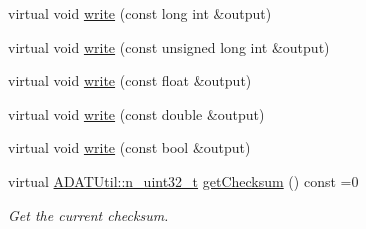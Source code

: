 \begin{DoxyCompactItemize}
\item 
virtual void \mbox{\hyperlink{classADATIO_1_1BinaryWriter_a4cbdd50c040308cc568e3686cc5e3498}{write}} (const long int \&output)
\item 
virtual void \mbox{\hyperlink{classADATIO_1_1BinaryWriter_a56802b37bf83a416fc8b12fab0372306}{write}} (const unsigned long int \&output)
\item 
virtual void \mbox{\hyperlink{classADATIO_1_1BinaryWriter_afa3e113cbf2644b6a568fd13a8a14a98}{write}} (const float \&output)
\item 
virtual void \mbox{\hyperlink{classADATIO_1_1BinaryWriter_a35edd828ed0235e1547a76088c133f46}{write}} (const double \&output)
\item 
virtual void \mbox{\hyperlink{classADATIO_1_1BinaryWriter_ac74f1fed73f135b69624436713ba8fe9}{write}} (const bool \&output)
\item 
virtual \mbox{\hyperlink{namespaceADATUtil_ad945a8afa4db2d1f89b731964adae97e}{A\+D\+A\+T\+Util\+::n\+\_\+uint32\+\_\+t}} \mbox{\hyperlink{classADATIO_1_1BinaryWriter_a8bebb70a7248b14c8a4dcf7aa49c1503}{get\+Checksum}} () const =0
\begin{DoxyCompactList}\small\item\em Get the current checksum. \end{DoxyCompactList}\end{DoxyCompactItemize}
